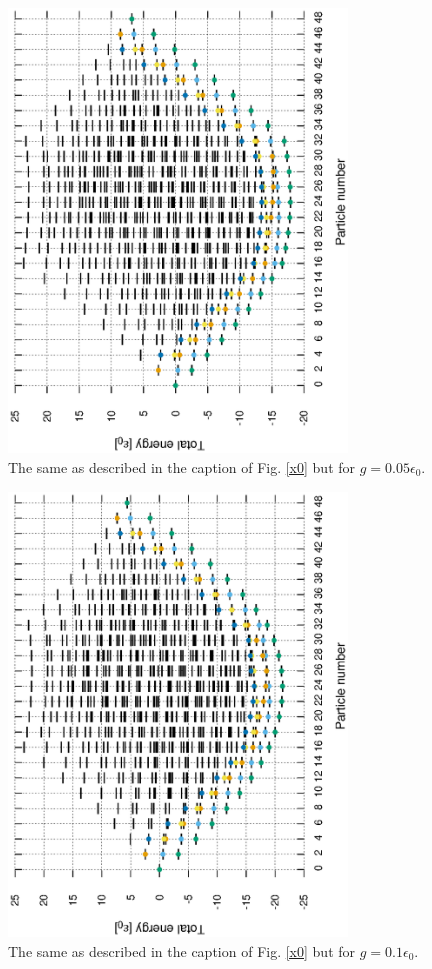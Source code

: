 \documentclass[11pt]{book} %
\begin{document}
\begin{figure}[htbp]
 \begin{center}
  \includegraphics[width=90mm,angle=-90]{images/spectra_g0p05.eps}
 \end{center}
 \caption{The same as described in the caption of Fig. \ref{x0} but for $g=0.05\epsilon_0$.
	}
 \label{g0p05}
\end{figure}

\begin{figure}[htbp]
 \begin{center}
  \includegraphics[width=90mm,angle=-90]{images/spectra_g0p1.eps}
 \end{center}
 \caption{The same as described in the caption of Fig. \ref{x0} but for $g=0.1\epsilon_0$.
	}
 \label{g0p1}
\end{figure}
\end{document}
